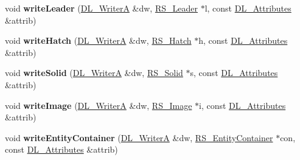\begin{DoxyCompactItemize}
\item 
\hypertarget{classRS__FilterDXF_aba00b2d925673e18647bf8a974a90512}{void {\bfseries write\-Leader} (\hyperlink{classDL__WriterA}{D\-L\-\_\-\-Writer\-A} \&dw, \hyperlink{classRS__Leader}{R\-S\-\_\-\-Leader} $\ast$l, const \hyperlink{classDL__Attributes}{D\-L\-\_\-\-Attributes} \&attrib)}\label{classRS__FilterDXF_aba00b2d925673e18647bf8a974a90512}

\item 
\hypertarget{classRS__FilterDXF_a9de82861d406069c5d6b77e01c28abe3}{void {\bfseries write\-Hatch} (\hyperlink{classDL__WriterA}{D\-L\-\_\-\-Writer\-A} \&dw, \hyperlink{classRS__Hatch}{R\-S\-\_\-\-Hatch} $\ast$h, const \hyperlink{classDL__Attributes}{D\-L\-\_\-\-Attributes} \&attrib)}\label{classRS__FilterDXF_a9de82861d406069c5d6b77e01c28abe3}

\item 
\hypertarget{classRS__FilterDXF_a6c538b7b1aa24d2afd07f9f473044ff8}{void {\bfseries write\-Solid} (\hyperlink{classDL__WriterA}{D\-L\-\_\-\-Writer\-A} \&dw, \hyperlink{classRS__Solid}{R\-S\-\_\-\-Solid} $\ast$s, const \hyperlink{classDL__Attributes}{D\-L\-\_\-\-Attributes} \&attrib)}\label{classRS__FilterDXF_a6c538b7b1aa24d2afd07f9f473044ff8}

\item 
\hypertarget{classRS__FilterDXF_a50d8bde873d8a3640955fa49b53037c4}{void {\bfseries write\-Image} (\hyperlink{classDL__WriterA}{D\-L\-\_\-\-Writer\-A} \&dw, \hyperlink{classRS__Image}{R\-S\-\_\-\-Image} $\ast$i, const \hyperlink{classDL__Attributes}{D\-L\-\_\-\-Attributes} \&attrib)}\label{classRS__FilterDXF_a50d8bde873d8a3640955fa49b53037c4}

\item 
\hypertarget{classRS__FilterDXF_ae1fb3118303ba07c269597a7e3f84c1e}{void {\bfseries write\-Entity\-Container} (\hyperlink{classDL__WriterA}{D\-L\-\_\-\-Writer\-A} \&dw, \hyperlink{classRS__EntityContainer}{R\-S\-\_\-\-Entity\-Container} $\ast$con, const \hyperlink{classDL__Attributes}{D\-L\-\_\-\-Attributes} \&attrib)}\label{classRS__FilterDXF_ae1fb3118303ba07c269597a7e3f84c1e}


\end{DoxyCompactItemize}
